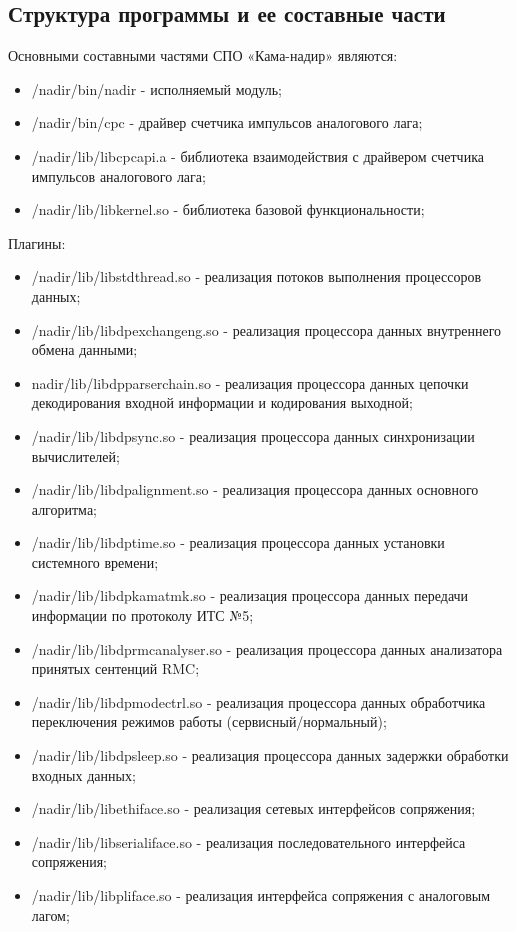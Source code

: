 \subsection{Структура программы и ее составные части}
Основными составными частями СПО «Кама-надир» являются:
\begin{itemize}
    \item /nadir/bin/nadir - исполняемый модуль;
    \item /nadir/bin/cpc - драйвер счетчика импульсов аналогового лага;
    \item /nadir/lib/libcpcapi.a - библиотека взаимодействия с драйвером счетчика импульсов аналогового лага;
    \item /nadir/lib/libkernel.so - библиотека базовой функциональности;
\end{itemize}
Плагины:
\begin{itemize}
\item /nadir/lib/libstdthread.so -  реализация потоков выполнения процессоров данных;
\item /nadir/lib/libdpexchangeng.so - реализация процессора данных внутреннего обмена данными;
\item nadir/lib/libdpparserchain.so - реализация процессора данных цепочки декодирования входной информации и кодирования выходной;
\item /nadir/lib/libdpsync.so - реализация процессора данных синхронизации вычислителей;
\item /nadir/lib/libdpalignment.so - реализация процессора данных основного алгоритма;
\item /nadir/lib/libdptime.so - реализация процессора данных установки системного времени;
\item /nadir/lib/libdpkamatmk.so - реализация процессора данных передачи информации по протоколу ИТС №5;
\item /nadir/lib/libdprmcanalyser.so - реализация процессора данных анализатора принятых сентенций RMC;
\item /nadir/lib/libdpmodectrl.so - реализация процессора данных обработчика переключения режимов работы (сервисный/нормальный);
\item /nadir/lib/libdpsleep.so - реализация процессора данных задержки обработки входных данных;
\item /nadir/lib/libethiface.so - реализация сетевых интерфейсов сопряжения;
\item /nadir/lib/libserialiface.so - реализация последовательного интерфейса сопряжения;
\item /nadir/lib/libpliface.so - реализация интерфейса сопряжения с аналоговым лагом;

\end{itemize}
